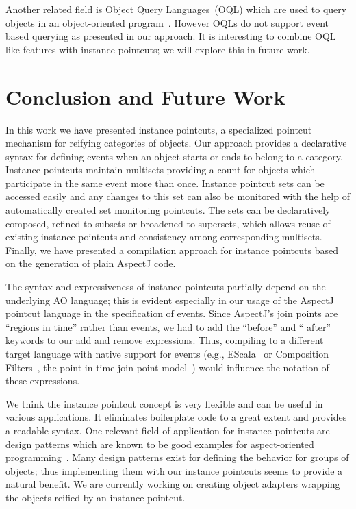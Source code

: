 \documentclass{llncs}
\begin{document}
Another related field is Object Query Languages~(OQL) which are used to query objects in an object-oriented program~\cite{cluet1998designing}. However OQLs do not support event based querying as presented in our approach. It is interesting to combine  OQL like features with instance pointcuts; we will explore this in future work. 


\section{Conclusion and Future Work}
In this work we have presented instance pointcuts, a specialized pointcut mechanism for reifying categories of objects. Our approach provides a declarative syntax for defining events when an object starts or ends to belong to a category. Instance pointcuts maintain multisets providing a count for objects which participate in the same event more than once. Instance pointcut sets can be accessed easily and any changes to this set can also be monitored with the help of automatically created set monitoring pointcuts. The sets can be declaratively composed, refined to subsets or broadened to supersets, which allows reuse of existing instance pointcuts and consistency among corresponding multisets. Finally, we have presented a compilation approach for instance pointcuts based on the generation of plain AspectJ code.

The syntax and expressiveness of instance pointcuts partially depend on the underlying AO language; this is evident especially in our usage of the AspectJ pointcut language in the specification of events. Since AspectJ's join points are ``regions in time'' rather than events, we had to add the ``before'' and `` after'' keywords to our add and remove expressions. Thus, compiling to a different target language with native support for events (e.g., EScala~\cite{Gasiunas2011} or Composition
Filters~\cite{Bergmans2001b}, the point-in-time join point model~\cite{masuharafine}) would influence the notation of these expressions.

We think the instance pointcut concept is very flexible and can be useful in various applications. It eliminates boilerplate code to a great extent and provides a readable syntax. One relevant field of application for instance pointcuts are design patterns which are known to be good examples for aspect-oriented programming~\cite{hannemann:oopsla02}. Many design patterns exist for defining the behavior for groups of objects; thus implementing them with our instance pointcuts seems to provide a natural benefit. We are currently working on creating object adapters wrapping the objects reified by an instance pointcut.




\end{document}
